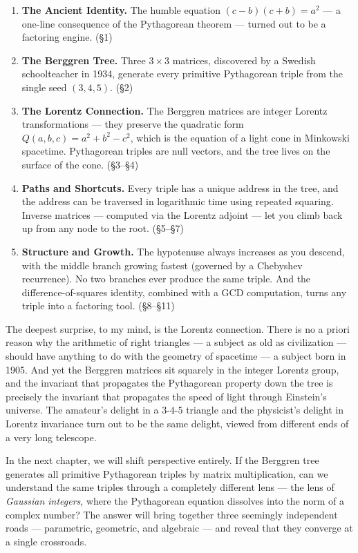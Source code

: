 \begin{enumerate}
\def\labelenumi{\arabic{enumi}.}
\item
  \textbf{The Ancient Identity.} The humble equation \((c - b)(c + b) = a^2\) --- a one-line consequence of the Pythagorean theorem --- turned out to be a factoring engine. (§1)
\item
  \textbf{The Berggren Tree.} Three \(3 \times 3\) matrices, discovered by a Swedish schoolteacher in 1934, generate every primitive Pythagorean triple from the single seed \((3, 4, 5)\). (§2)
\item
  \textbf{The Lorentz Connection.} The Berggren matrices are integer Lorentz transformations --- they preserve the quadratic form \(Q(a, b, c) = a^2 + b^2 - c^2\), which is the equation of a light cone in Minkowski spacetime. Pythagorean triples are null vectors, and the tree lives on the surface of the cone. (§3--§4)
\item
  \textbf{Paths and Shortcuts.} Every triple has a unique address in the tree, and the address can be traversed in logarithmic time using repeated squaring. Inverse matrices --- computed via the Lorentz adjoint --- let you climb back up from any node to the root. (§5--§7)
\item
  \textbf{Structure and Growth.} The hypotenuse always increases as you descend, with the middle branch growing fastest (governed by a Chebyshev recurrence). No two branches ever produce the same triple. And the difference-of-squares identity, combined with a GCD computation, turns any triple into a factoring tool. (§8--§11)
\end{enumerate}

The deepest surprise, to my mind, is the Lorentz connection. There is no a priori reason why the arithmetic of right triangles --- a subject as old as civilization --- should have anything to do with the geometry of spacetime --- a subject born in 1905. And yet the Berggren matrices sit squarely in the integer Lorentz group, and the invariant that propagates the Pythagorean property down the tree is precisely the invariant that propagates the speed of light through Einstein's universe. The amateur's delight in a \(3\)-\(4\)-\(5\) triangle and the physicist's delight in Lorentz invariance turn out to be the same delight, viewed from different ends of a very long telescope.

In the next chapter, we will shift perspective entirely. If the Berggren tree generates all primitive Pythagorean triples by matrix multiplication, can we understand the same triples through a completely different lens --- the lens of \emph{Gaussian integers}, where the Pythagorean equation dissolves into the norm of a complex number? The answer will bring together three seemingly independent roads --- parametric, geometric, and algebraic --- and reveal that they converge at a single crossroads.

